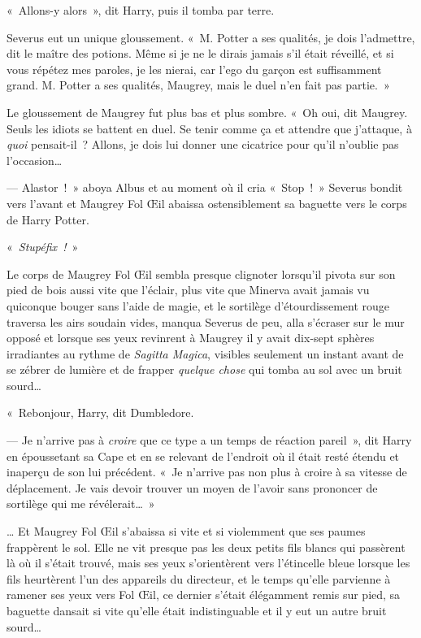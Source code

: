 «~Allons-y alors~», dit Harry, puis il tomba par terre.

Severus eut un unique gloussement. «~M. Potter a ses qualités, je dois l'admettre, dit le maître des potions. Même si je ne le dirais jamais s'il était réveillé, et si vous répétez mes paroles, je les nierai, car l'ego du garçon est suffisamment grand. M. Potter a ses qualités, Maugrey, mais le duel n'en fait pas partie.~»

Le gloussement de Maugrey fut plus bas et plus sombre. «~Oh oui, dit Maugrey. Seuls les idiots se battent en duel. Se tenir comme ça et attendre que j'attaque, à \emph{quoi} pensait-il~? Allons, je dois lui donner une cicatrice pour qu'il n'oublie pas l'occasion…

--- Alastor~!~» aboya Albus et au moment où il cria «~Stop~!~» Severus bondit vers l'avant et Maugrey Fol Œil abaissa ostensiblement sa baguette vers le corps de Harry Potter.

«~\emph{Stupéfix~!}~»

Le corps de Maugrey Fol Œil sembla presque clignoter lorsqu'il pivota sur son pied de bois aussi vite que l'éclair, plus vite que Minerva avait jamais vu quiconque bouger sans l'aide de magie, et le sortilège d'étourdissement rouge traversa les airs soudain vides, manqua Severus de peu, alla s'écraser sur le mur opposé et lorsque ses yeux revinrent à Maugrey il y avait dix-sept sphères irradiantes au rythme de \emph{Sagitta Magica}, visibles seulement un instant avant de se zébrer de lumière et de frapper \emph{quelque chose} qui tomba au sol avec un bruit sourd…

\later

«~Rebonjour, Harry, dit Dumbledore.

--- Je n'arrive pas à \emph{croire} que ce type a un temps de réaction pareil~», dit Harry en époussetant sa Cape et en se relevant de l'endroit où il était resté étendu et inaperçu de son lui précédent. «~Je n'arrive pas non plus à croire à sa vitesse de déplacement. Je vais devoir trouver un moyen de l'avoir sans prononcer de sortilège qui me révélerait…~»

\later

… Et Maugrey Fol Œil s'abaissa si vite et si violemment que ses paumes frappèrent le sol. Elle ne vit presque pas les deux petits fils blancs qui passèrent là où il s'était trouvé, mais ses yeux s'orientèrent vers l'étincelle bleue lorsque les fils heurtèrent l'un des appareils du directeur, et le temps qu'elle parvienne à ramener ses yeux vers Fol Œil, ce dernier s'était élégamment remis sur pied, sa baguette dansait si vite qu'elle était indistinguable et il y eut un autre bruit sourd…

